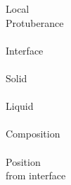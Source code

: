 Local \\ Protuberance \\ \\
Interface \\ \\
Solid \\ \\
Liquid \\ \\ 
Composition \\ \\ 
Position \\  from interface \\ \\